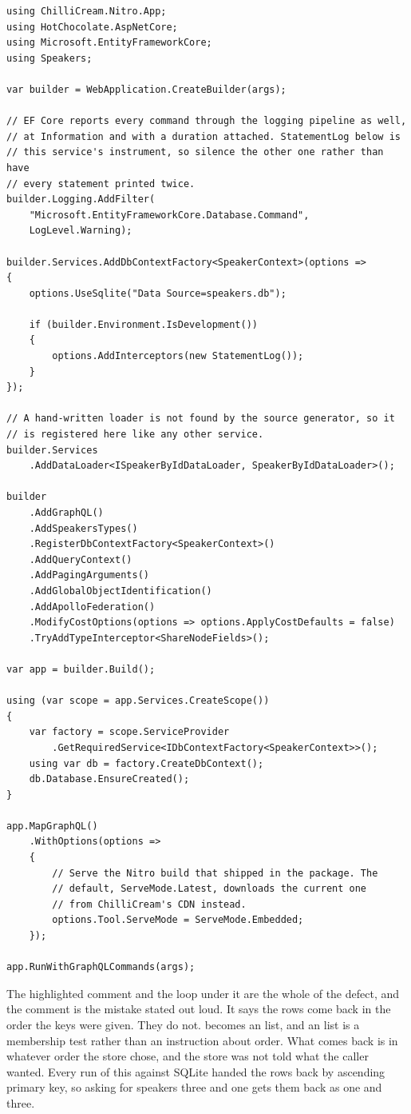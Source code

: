 \begin{verbatim}
using ChilliCream.Nitro.App;
using HotChocolate.AspNetCore;
using Microsoft.EntityFrameworkCore;
using Speakers;

var builder = WebApplication.CreateBuilder(args);

// EF Core reports every command through the logging pipeline as well,
// at Information and with a duration attached. StatementLog below is
// this service's instrument, so silence the other one rather than have
// every statement printed twice.
builder.Logging.AddFilter(
    "Microsoft.EntityFrameworkCore.Database.Command",
    LogLevel.Warning);

builder.Services.AddDbContextFactory<SpeakerContext>(options =>
{
    options.UseSqlite("Data Source=speakers.db");

    if (builder.Environment.IsDevelopment())
    {
        options.AddInterceptors(new StatementLog());
    }
});

// A hand-written loader is not found by the source generator, so it
// is registered here like any other service.
builder.Services
    .AddDataLoader<ISpeakerByIdDataLoader, SpeakerByIdDataLoader>();

builder
    .AddGraphQL()
    .AddSpeakersTypes()
    .RegisterDbContextFactory<SpeakerContext>()
    .AddQueryContext()
    .AddPagingArguments()
    .AddGlobalObjectIdentification()
    .AddApolloFederation()
    .ModifyCostOptions(options => options.ApplyCostDefaults = false)
    .TryAddTypeInterceptor<ShareNodeFields>();

var app = builder.Build();

using (var scope = app.Services.CreateScope())
{
    var factory = scope.ServiceProvider
        .GetRequiredService<IDbContextFactory<SpeakerContext>>();
    using var db = factory.CreateDbContext();
    db.Database.EnsureCreated();
}

app.MapGraphQL()
    .WithOptions(options =>
    {
        // Serve the Nitro build that shipped in the package. The
        // default, ServeMode.Latest, downloads the current one
        // from ChilliCream's CDN instead.
        options.Tool.ServeMode = ServeMode.Embedded;
    });

app.RunWithGraphQLCommands(args);
\end{verbatim}

%
The highlighted comment and the loop under it are the whole of the defect, and
the comment is the mistake stated out loud. It says the rows come back in the
order the keys were given. They do not.
 becomes an  list, and an  list is a
membership test rather than an instruction about order. What comes back is in
whatever order the store chose, and the store was not told what the caller
wanted. Every run of this against SQLite handed the rows back by ascending
primary key, so asking for speakers three and one gets them back as one and
three.

